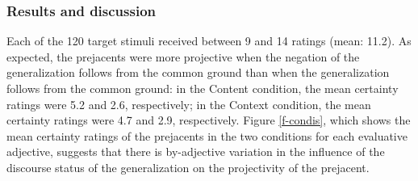 \documentclass[11pt,fleqn]{article}
\newcommand{\6}{\mbox{$[\hspace*{-.6mm}[$}}
\newcommand{\9}{\mbox{$]\hspace*{-.6mm}]$}}
\begin{document}
\subsubsection{Results and discussion}

Each of the 120 target stimuli received between 9 and 14 ratings (mean: 11.2). As expected, the prejacents were more projective when the negation of the generalization follows from the common ground than when the generalization follows from the common ground: in the Content condition, the mean certainty ratings were 5.2 and 2.6, respectively; in the Context condition, the mean certainty ratings were 4.7 and 2.9, respectively. Figure \ref{f-condis}, which shows the mean certainty ratings of the prejacents in the two conditions for each evaluative adjective, suggests that there is by-adjective variation in the influence of the discourse status of the generalization on the projectivity of the prejacent.
\end{document}

